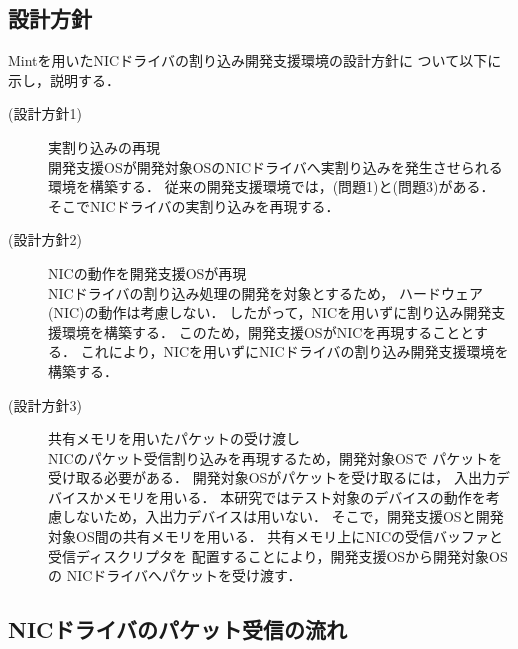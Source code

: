 \documentclass[submit,techreq,noauthor,dvipdfmx]{ipsj}
\begin{document}
\subsection{設計方針}\label{sec:policy_of_design}

Mintを用いたNICドライバの割り込み開発支援環境の設計方針に
ついて以下に示し，説明する．

\begin{description}
    \item[(設計方針1)] 実割り込みの再現\\
        開発支援OSが開発対象OSのNICドライバへ実割り込みを発生させられる
        環境を構築する．
        従来の開発支援環境では，(問題1)と(問題3)がある．
        そこでNICドライバの実割り込みを再現する．
    \item[(設計方針2)] NICの動作を開発支援OSが再現\\
        NICドライバの割り込み処理の開発を対象とするため，
        ハードウェア(NIC)の動作は考慮しない．
        したがって，NICを用いずに割り込み開発支援環境を構築する．
        このため，開発支援OSがNICを再現することとする．
        これにより，NICを用いずにNICドライバの割り込み開発支援環境を構築する．
    \item[(設計方針3)] 共有メモリを用いたパケットの受け渡し\\
        NICのパケット受信割り込みを再現するため，開発対象OSで
        パケットを受け取る必要がある．
        開発対象OSがパケットを受け取るには，
        入出力デバイスかメモリを用いる．
        本研究ではテスト対象のデバイスの動作を考慮しないため，入出力デバイスは用いない．
        そこで，開発支援OSと開発対象OS間の共有メモリを用いる．
        共有メモリ上にNICの受信バッファと受信ディスクリプタを
        配置することにより，開発支援OSから開発対象OSの
        NICドライバへパケットを受け渡す．
\end{description}

\subsection{NICドライバのパケット受信の流れ}\label{sec:flow_of_recieving_packet_in_NIC_driver}

\end{document}
